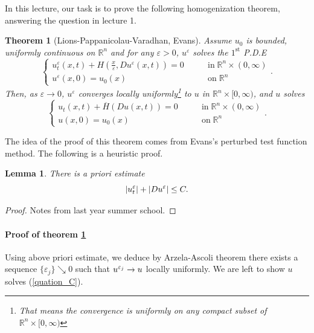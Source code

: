 \documentclass[12pt, oneside]{amsart}  	%
\newtheorem{theorem}{Theorem}
\newtheorem{lemma}{Lemma}
\begin{document}
In this lecture, our task is to prove the following homogenization theorem, answering the question in lecture 1.

\begin{theorem}[Lions-Pappanicolau-Varadhan, Evans] \label{theorem2} Assume $u_0$ is bounded, uniformly continuous on $\mathbb{R}^n$ and for any $\varepsilon>0$, $u^\varepsilon$ solves the $1^{\text{st}}$ P.D.E
\begin{equation}\label{quation_C_varepsilon}
\begin{cases}
u_t^\varepsilon(x,t) + H\left(\frac{x}{\varepsilon}, Du^\varepsilon(x,t)\right)  = 0 &\qquad\text{in}\;\mathbb{R}^n\times(0,\infty) \\
u^\varepsilon(x,0) = u_0(x) &\qquad\text{on}\;\mathbb{R}^n
\end{cases} \tag{$C_\varepsilon$}.
\end{equation}
Then, as $\varepsilon\longrightarrow 0$, $u^\varepsilon$ converges locally uniformly\footnote{That means the convergence is uniformly on any compact subset of $\mathbb{R}^n\times [0,\infty)$} to $u$ in $\mathbb{R}^n\times [0,\infty)$, and $u$ solves
\begin{equation}\label{quation_C}
\begin{cases}
u_t(x,t) + \overline{H}\left(Du(x,t)\right)  = 0 &\qquad\text{in}\;\mathbb{R}^n\times(0,\infty) \\
u(x,0) = u_0(x) &\qquad\text{on}\;\mathbb{R}^n
\end{cases} \tag{$C$}.
\end{equation}
\end{theorem}
The idea of the proof of this theorem comes from Evans's perturbed test function method. The following is a heuristic proof.

\begin{lemma}
	There is a priori estimate $$|u^\varepsilon_t|+|Du^\varepsilon| \le C.$$
\end{lemma}
\begin{proof} Notes from last year summer school.
\end{proof}

\paragraph{\textbf{Proof of theorem} \ref{theorem2}} Using above priori estimate, we deduce by Arzela-Ascoli theorem there exists a sequence $\{\varepsilon_j\} \searrow 0$ such that $u^{\varepsilon_j}\to u$ locally uniformly. We are left to show $u$ solves (\ref{quation_C}).\\
\end{document}
